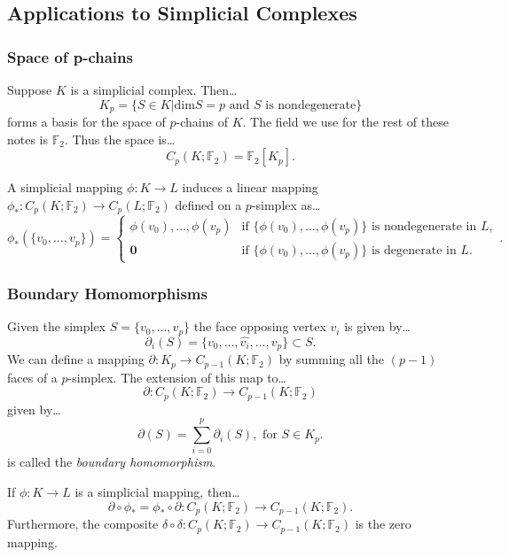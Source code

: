 \subsection{Applications to Simplicial Complexes}\label{simplicialhomology}

\subsubsection{Space of p-chains}\label{pchains}
Suppose $K$ is a simplicial complex. Then\dots
$$K_p = \{ S \in K | \textrm{dim} S = p \textrm{ and } S \textrm{ is nondegenerate} \}$$
forms a basis for the space of $p$-chains of $K$. The field we use for the rest of these notes is $\mathbb{F}_2$.
Thus the space is\dots
$$C_p(K; \mathbb{F}_2) = \mathbb{F}_2[K_p].$$

\noindent A simplicial mapping $\phi : K \rightarrow L$ induces a linear mapping $\phi_* : C_p(K; \mathbb{F}_2) \rightarrow C_p(L; \mathbb{F}_2)$
defined on a $p$-simplex as\dots
\[
\phi_*(\{v_0,\dots,v_p\}) = \begin{cases}
                                \phi(v_0),\dots,\phi(v_p) & \textrm{if } \{ \phi(v_0), \dots, \phi(v_p) \} \textrm{ is nondegenerate in } L,\\
                                \textbf{0} & \textrm{if } \{ \phi(v_0), \dots, \phi(v_p) \} \textrm{ is degenerate in } L.
                            \end{cases}.
\]

\subsubsection{Boundary Homomorphisms}\label{boundaryhomomorphism}
Given the simplex $S = \{ v_0, \dots, v_p \}$ the face opposing vertex $v_i$ is given by\dots
$$\partial_i(S) = \{ v_0, \dots, \hat{v_i}, \dots, v_p \} \subset S.$$
We can define a mapping $\partial : K_p \rightarrow C_{p-1}(K; \mathbb{F}_2)$ by summing all the $(p-1)$
faces of a $p$-simplex. The extension of this map to\dots
$$\partial : C_{p}(K; \mathbb{F}_2) \rightarrow C_{p-1}(K; \mathbb{F}_2)$$
given by\dots
$$\partial(S) = \sum_{i=0}^p \partial_i(S), \textrm{ for } S \in K_p.$$
is called the \emph{boundary homomorphism}.

\begin{proposition}
If $\phi : K \rightarrow L$ is a simplicial mapping, then\dots
$$\partial \circ \phi_* = \phi_* \circ \partial : C_{p}(K; \mathbb{F}_2) \rightarrow C_{p-1}(K; \mathbb{F}_2).$$
Furthermore, the composite $\delta \circ \delta : C_p(K; \mathbb{F}_2) \rightarrow C_{p-1}(K; \mathbb{F}_2)$ is
the zero mapping.
\end{proposition}

